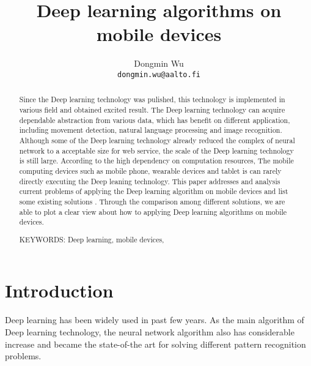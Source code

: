 \documentclass[article]{aaltoseries}
\begin{document}
 

\title{Deep learning algorithms on mobile devices}

\author{Dongmin Wu
\\\textnormal{\texttt{dongmin.wu@aalto.fi}}} %


\maketitle


\begin{abstract}

  Since the Deep learning technology was pulished, this technology is
  implemented in various field and obtained excited result. The Deep learning technology can acquire 
  dependable abstraction from various data, which has benefit on different application, 
  including movement detection, natural language processing and image recognition. 
  Although some of the Deep learning technology 
  already reduced the complex of neural network to a acceptable size for web service, the 
 scale of the Deep learning technology is still large. According to the high dependency on computation resources,
 The mobile computing
  devices such as mobile phone, wearable devices and tablet is can rarely directly executing the Deep leaning technology. 
  This paper addresses and analysis current problems
   of applying the Deep learning algorithm on mobile devices and list some existing solutions
  . Through the comparison among different solutions, we are able to 
  plot a clear view about how to applying Deep learning algorithms on mobile devices.

\vspace{3mm}
\noindent KEYWORDS: Deep learning, mobile devices, 

\end{abstract}




\section{Introduction}


Deep learning has been widely used in past few years. As the main algorithm of Deep learning technology,
 the neural network algorithm 
also has considerable increase and became the state-of-the art for solving different pattern recognition
problems.
\end{document}
